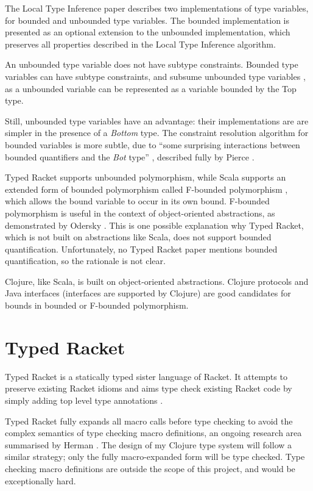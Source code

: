 The Local Type Inference paper \cite{Pierce:2000:LTI:345099.345100}
describes two implementations of type variables, for bounded
and unbounded type variables. The bounded implementation is presented
as an optional extension  to the unbounded implementation, which preserves all
properties described in the Local Type Inference algorithm.

An unbounded type variable does not have subtype constraints.
Bounded type variables can have subtype constraints, and 
subsume unbounded type variables \cite{Pierce:2000:LTI:345099.345100}, 
as a unbounded variable can be represented as a variable bounded
by the Top type.

Still, unbounded type variables have an advantage: their implementations are
are simpler in the presence of a \emph{Bottom} type. 
The constraint resolution algorithm for bounded variables
is more subtle, due to ``some surprising interactions between bounded quantifiers
and the \emph{Bot} type'' \cite{Pierce:2000:LTI:345099.345100}, described fully
by Pierce \cite{Pierce97boundedquantification}.

Typed Racket \cite{Tobin-Hochstadt:2008:DIT:1328897.1328486}
supports unbounded polymorphism, while Scala \cite{Odersky06anoverview}
supports an extended form of bounded polymorphism called
F-bounded polymorphism \cite{Canning:1989:FPO:99370.99392}, which allows the
bound variable to occur in its own bound.
F-bounded polymorphism is useful in the context of object-oriented abstractions,
as demonstrated by Odersky \cite{Odersky06anoverview}.
This is one possible explanation why Typed Racket, which is not built on abstractions like Scala,
does not support bounded quantification. Unfortunately, no Typed Racket paper mentions 
bounded quantification, so the rationale is not clear.

Clojure, like Scala, is built on object-oriented abstractions. Clojure protocols
and Java interfaces (interfaces are supported by Clojure) are good candidates
for bounds in bounded or F-bounded polymorphism.

\section{Typed Racket}

Typed Racket is a statically typed sister language of Racket. It
attempts to preserve existing Racket idioms and aims type check
existing Racket code by simply adding top level type annotations \cite{SAMTH:dissertation}.

Typed Racket fully expands all macro calls before type checking \cite{SAMTH:dissertation} to
avoid the complex semantics of type checking macro definitions, an ongoing research area summarised
 by Herman \cite{Herman10:Theory}.
The design of my Clojure type system will follow a similar strategy; only the fully macro-expanded form
will be type checked. Type checking macro definitions are outside the scope of this project, and would
be exceptionally hard.

